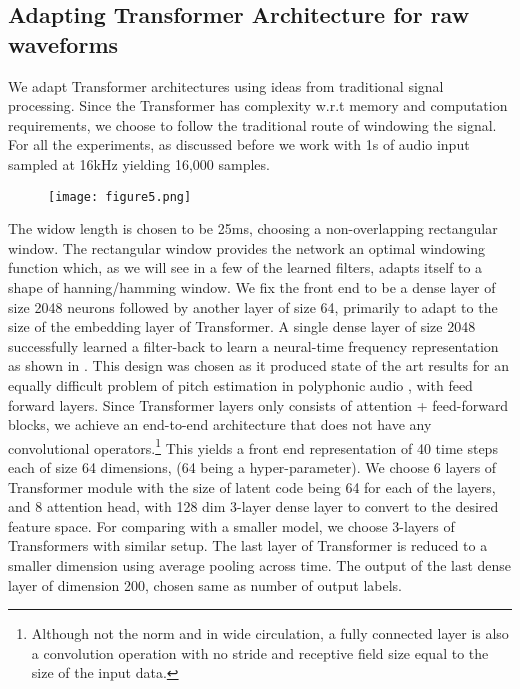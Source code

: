 \documentclass{article}
\begin{document}
\begin{sloppy}
\subsection{Adapting Transformer Architecture for raw waveforms}
We adapt Transformer architectures using ideas from traditional signal processing. Since the Transformer has   complexity w.r.t memory and computation requirements, we choose to follow the traditional route of windowing the signal. For all the experiments, as discussed before we work with 1s of audio input sampled at 16kHz yielding 16,000 samples. 

\begin{figure}[h]
\centering
\texttt{[image: figure5.png]}
\end{figure}

The widow length is chosen to be 25ms, choosing a non-overlapping rectangular window. The rectangular window provides the network an optimal windowing function which, as we will see in a few of the learned filters, adapts itself to a shape of hanning/hamming window. We fix the front end to be a dense layer of size 2048 neurons followed by another layer of size 64, primarily to adapt to the size of the embedding layer of Transformer. A single dense layer of size 2048 successfully learned a filter-back to learn a neural-time frequency representation as shown in \cite{verma2016frequency}. This design was chosen as it produced state of the art results for an equally difficult problem of pitch estimation in polyphonic audio \cite{verma2016frequency}, with feed forward layers. Since Transformer layers only consists of attention + feed-forward blocks, we achieve an end-to-end architecture that does not have any convolutional operators.\footnote[1]{Although not the norm and in wide circulation,  a fully connected layer is also a convolution operation with no stride and receptive field size equal to the size of the input data. } 
This yields a front end representation of 40 time steps each of size 64 dimensions, (64 being a hyper-parameter). We choose 6 layers of Transformer module with the size of latent code being 64 for each of the layers, and 8 attention head, with 128 dim 3-layer dense layer to convert to the desired feature space. For comparing with a smaller model, we choose 3-layers of Transformers with similar setup. The last layer of Transformer is reduced to a smaller dimension using average pooling across time. The output of the last dense layer of dimension 200, chosen same as number of output labels. 



\end{sloppy}
\end{document}
